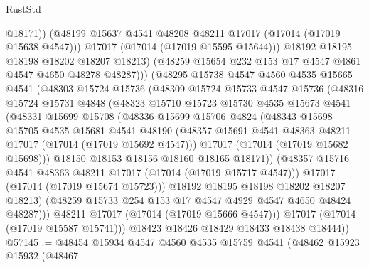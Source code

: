 \begin{lexlean}{RustStd}
\begin{coremodule}
                      @18171))
                  (@48199 @15637 @4541 @48208 @48211 @17017 (@17014 (@17019 @15638 @4547)))
                  @17017
                  (@17014 (@17019 @15595 @15644)))
                @18192
                @18195
                @18198
                @18202
                @18207
                @18213)
              (@48259 @15654 @232 @153 @17 @4547 @4861 @4547 @4650 @48278 @48287)))
          (@48295
            @15738
            @4547
            @4560
            @4535
            @15665
            @4541
            (@48303
              @15724
              @15736
              (@48309
                @15724
                @15733
                @4547
                @15736
                (@48316
                  @15724
                  @15731
                  @4848
                  (@48323
                    @15710
                    @15723
                    @15730
                    @4535
                    @15673
                    @4541
                    (@48331
                      @15699
                      @15708
                      (@48336
                        @15699
                        @15706
                        @4824
                        (@48343
                          @15698
                          @15705
                          @4535
                          @15681
                          @4541
                          @48190
                          (@48357 @15691 @4541 @48363 @48211 @17017 (@17014 (@17019 @15692 @4547)))
                          @17017
                          (@17014 (@17019 @15682 @15698)))
                        @18150
                        @18153
                        @18156
                        @18160
                        @18165
                        @18171))
                    (@48357 @15716 @4541 @48363 @48211 @17017 (@17014 (@17019 @15717 @4547)))
                    @17017
                    (@17014 (@17019 @15674 @15723)))
                  @18192
                  @18195
                  @18198
                  @18202
                  @18207
                  @18213)
                (@48259 @15733 @254 @153 @17 @4547 @4929 @4547 @4650 @48424 @48287)))
            @48211
            @17017
            (@17014 (@17019 @15666 @4547)))
          @17017
          (@17014 (@17019 @15587 @15741)))
        @18423
        @18426
        @18429
        @18433
        @18438
        @18444))
@57145 := @48454
    @15934
    @4547
    @4560
    @4535
    @15759
    @4541
    (@48462
      @15923
      @15932
      (@48467

\end{coremodule}
\end{lexlean}
